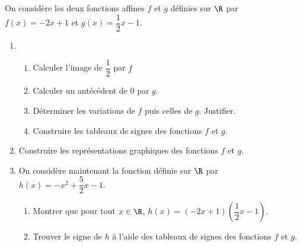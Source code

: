 \documentclass[a4paper]{article}
\begin{document}
  \begin{exerciceinterro}{}{}
    On considère les deux fonctions affines $f$ et $g$ définies sur $\R$ par $f(x)=-2x+1$ et $g(x)=\dfrac{1}{2}x-1$.
  
    \begin{enumerate}
      \item \begin{enumerate}
        \item Calculer l'image de $\dfrac{1}{2}$ par $f$
        \item Calculer un antécédent de $0$ par $g$.
        \item Déterminer les variations de $f$ puis celles de $g$. Justifier.
        \item Construire les tableaux de signes des fonctions $f$ et $g$.
      \end{enumerate}
  
      \item Construire les représentations graphiques des fonctions $f$ et $g$.

      \item On considère maintenant la fonction définie sur $\R$ par $h(x)=-x^2+\dfrac{5}{2}x-1$.
      \begin{enumerate}
        \item Montrer que pour tout $x\in \R$, $h(x)=(-2x+1)(\dfrac{1}{2}x-1)$.
        \item Trouver le signe de $h$ à l'aide des tableaux de signes des fonctions $f$ et $g$.
      \end{enumerate} 
    \end{enumerate}
  \end{exerciceinterro}
  
  \medskip
\end{document}
